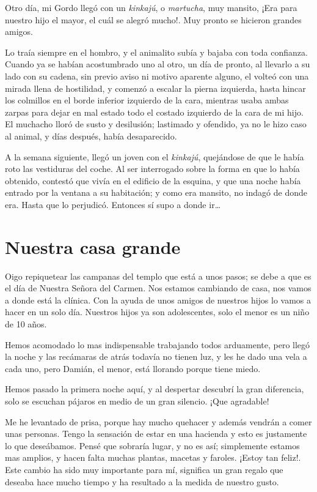 \documentclass[letterpaper, 12pt]{book}
\begin{document}
Otro día, mi Gordo llegó con un {\it kinkajú}, o {\it martucha}, muy mansito, ¡Era para nuestro hijo el mayor, el cuál se alegró mucho!. Muy pronto se hicieron grandes amigos.

Lo traía siempre en el hombro, y el animalito subía y bajaba con toda confianza. Cuando ya se habían acostumbrado uno al otro, un día de pronto, al llevarlo a su lado con su cadena, sin previo aviso ni motivo aparente alguno, el volteó con una mirada llena de hostilidad, y comenzó a escalar la pierna izquierda, hasta hincar los colmillos en el borde inferior izquierdo de la cara, mientras usaba ambas zarpas para dejar en mal estado todo el costado izquierdo de la cara de mi hijo. El muchacho lloró de susto y desilusión; lastimado y ofendido, ya no le hizo caso al animal, y días después, había desaparecido.

A la semana siguiente, llegó un joven con el {\it kinkajú}, quejándose de que le había roto las vestiduras del coche. Al ser interrogado sobre la forma en que lo había obtenido, contestó que vivía en el edificio de la esquina, y que una noche había entrado por la ventana a su habitación; y como era mansito, no indagó de donde era. Hasta que lo perjudicó. Entonces sí supo a donde ir\ldots

\chapter{Nuestra casa grande}
Oigo repiquetear las campanas del templo que está a unos pasos; se debe a que es el día de Nuestra Señora del Carmen. Nos estamos cambiando de casa, nos vamos a donde está la clínica. Con la ayuda de unos amigos de nuestros hijos lo vamos a hacer en un solo día. Nuestros hijos ya son adolescentes, solo el menor es un niño de 10 años. 

Hemos acomodado lo mas indispensable trabajando todos arduamente, pero llegó la noche y las recámaras de atrás todavía no tienen luz, y les he dado una vela a cada uno, pero Damián, el menor, está llorando porque tiene miedo.

Hemos pasado la primera noche aquí, y al despertar descubrí la gran diferencia, solo se escuchan pájaros en medio de un gran silencio. ¡Que agradable!

Me he levantado de prisa, porque hay mucho quehacer y además vendrán a comer unas personas. Tengo la sensación de estar en una hacienda y esto es justamente lo que deseábamos. Pensé que sobraría lugar, y no es así; simplemente estamos mas amplios, y hacen falta muchas plantas, macetas y faroles. ¡Estoy tan feliz!. Este cambio ha sido muy importante para mí, significa un gran regalo que deseaba hace mucho tiempo y ha resultado a la medida de nuestro gusto.
\end{document}
